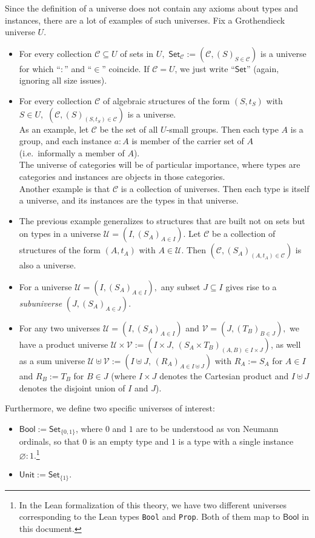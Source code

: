 \documentclass[a4paper]{article}
\theoremstyle{definition}
\theoremstyle{remark}
\newcommand{\defn}{\emph}
\renewcommand{\emptyset}{\varnothing}
\newcommand{\C}{\mathcal{C}}
\newcommand{\U}{\mathcal{U}}
\newcommand{\V}{\mathcal{V}}
\newcommand{\nm}{\mathsf}
\newcommand{\universe}{\nm}
\newcommand{\Unit}{\universe{Unit}}
\newcommand{\Bool}{\universe{Bool}}
\newcommand{\Set}{\universe{Set}}
\newcommand{\Lean}{\texttt}
\begin{document}
Since the definition of a universe does not contain any axioms about types and instances, there
are a lot of examples of such universes. Fix a Grothendieck universe $U.$

\begin{itemize}
  \item For every collection $\C \subseteq U$ of sets in $U,$ $\Set_\C := (\C, (S)_{S \in \C})$ is a
  universe for which ``$:$'' and ``$\in$'' coincide.
  If $\C = U$, we just write ``$\Set$'' (again, ignoring all size issues).
  \item For every collection $\C$ of algebraic structures of the form $(S, t_S)$ with $S \in U,$
  $(\C, (S)_{(S, t_S) \in \C})$ is a universe.\\
  As an example, let $\C$ be the set of all $U$-small groups. Then each type $A$ is a group, and
  each instance $a : A$ is member of the carrier set of $A$ (i.e.\ informally a member of $A$).\\
  The universe of categories will be of particular importance, where types are categories and instances
  are objects in those categories.\\
  Another example is that $\C$ is a collection of universes. Then each type is itself a universe, and
  its instances are the types in that universe.
  \item The previous example generalizes to structures that are built not on sets but on types in a
  universe $\U = (I, (S_A)_{A \in I}).$ Let $\C$ be a collection of structures of the form $(A,t_A)$ with
  $A \in \U$. Then $(\C, (S_A)_{(A, t_A) \in \C})$ is also a universe.
  \item For a universe $\U = (I, (S_A)_{A \in I}),$ any subset $J \subseteq I$ gives rise to a
  \defn{subuniverse} $(J, (S_A)_{A \in J}).$
  \item For any two universes $\U = (I, (S_A)_{A \in I})$ and $\V = (J, (T_B)_{B \in J}),$ we have a
  product universe $\U \times \V := (I{\times}J,\,(S_A{\times}T_B)_{(A,B) \in I{\times}J})$, as well as a
  sum universe $\U \uplus \V := (I \uplus J,\,(R_A)_{A \in I \uplus J})$ with $R_A := S_A$ for $A \in I$
  and $R_B := T_B$ for $B \in J$ (where $I \times J$ denotes the Cartesian product and $I \uplus J$
  denotes the disjoint union of $I$ and $J$).
\end{itemize}

Furthermore, we define two specific universes of interest:
\begin{itemize}
  \item $\Bool := \Set_{\{0, 1\}}$, where $0$ and $1$ are to be understood as von Neumann
  ordinals\cite{von-neumann-ordinals}, so that $0$ is an empty type and $1$ is a type with a single
  instance $\emptyset : 1.$\footnote{In the Lean formalization of this theory, we have two different universes
  corresponding to the Lean types \Lean{Bool} and \Lean{Prop}. Both of them map to $\Bool$ in this document.}
  \item $\Unit := \Set_{\{1\}}.$
\end{itemize}
\end{document}

